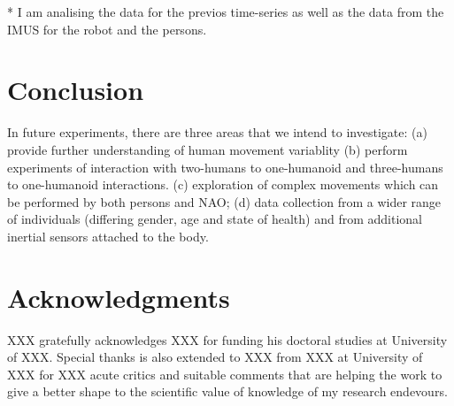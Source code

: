 \documentclass{sigchi}
\begin{document}
* I am analising the data for the previos time-series as well as the
data from the IMUS for the robot and the persons.



\section{Conclusion}

In future experiments, there are three areas that we intend to investigate:
(a) provide further understanding of human movement variablity
(b) perform experiments of interaction with two-humans to one-humanoid and
 three-humans to one-humanoid interactions.
(c) exploration of complex movements which can be performed by both persons and NAO;
(d) data collection from a wider range of individuals (differing gender, age and state of health)
 and from additional inertial sensors attached to the body.






\section{Acknowledgments}

XXX gratefully acknowledges XXX for funding his doctoral studies at
University of XXX. Special thanks is also extended to XXX from XXX at
University of XXX for XXX
acute critics and suitable comments that are helping the work to give a better
shape to the scientific value of knowledge of my research endevours.


%
%
%
%
%


\balance{}



\end{document}
